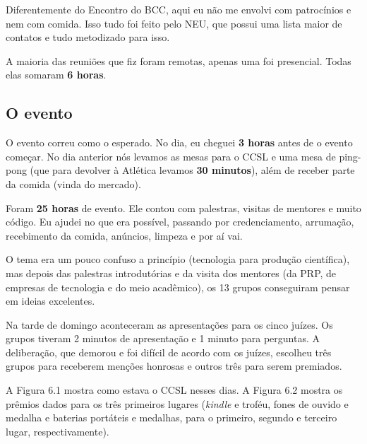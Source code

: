 \documentclass[12pt,letterpaper]{article}
\begin{document}
	Diferentemente do Encontro do BCC, aqui eu não me envolvi com patrocínios e nem com comida. Isso tudo foi feito pelo NEU, que possui uma lista maior de contatos e tudo metodizado para isso.
	
	A maioria das reuniões que fiz foram remotas, apenas uma foi presencial. Todas elas somaram \textbf{6 horas}.
	
	\subsection{O evento}
	O evento correu como o esperado. No dia, eu cheguei \textbf{3 horas} antes de o evento começar. No dia anterior nós levamos as mesas para o CCSL e uma mesa de ping-pong (que para devolver à Atlética levamos \textbf{30 minutos}), além de receber parte da comida (vinda do mercado).
	
	Foram \textbf{25 horas} de evento. Ele contou com palestras, visitas de mentores e muito código. Eu ajudei no que era possível, passando por credenciamento, arrumação, recebimento da comida, anúncios, limpeza e por aí vai.
	
	O tema era um pouco confuso a princípio (tecnologia para produção científica), mas depois das palestras introdutórias e da visita dos mentores (da PRP, de empresas de tecnologia e do meio acadêmico), os 13 grupos conseguiram pensar em ideias excelentes.
	
	Na tarde de domingo aconteceram as apresentações para os cinco juízes. Os grupos tiveram 2 minutos de apresentação e 1 minuto para perguntas. A deliberação, que demorou e foi difícil de acordo com os juízes, escolheu três grupos para receberem menções honrosas e outros três para serem premiados. 
	
	A Figura 6.1 mostra como estava o CCSL nesses dias. A Figura 6.2 mostra os prêmios dados para os três primeiros lugares (\textit{kindle} e troféu, fones de ouvido e medalha e baterias portáteis e medalhas, para o primeiro, segundo e terceiro lugar, respectivamente).
	
\end{document}
